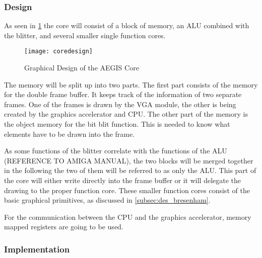 \subsubsection*{Design}
As seen in \cref{img:coredes} the core will consist of a block of memory, an ALU combined with the blitter, and several smaller single function cores.
\begin{figure}[H]
	\centering
	\texttt{[image: coredesign]}
	\caption{Graphical Design of the AEGIS Core }
	\label{img:coredes}
\end{figure}

The memory will be split up into two parts. The first part consists of the memory for the double frame buffer. It keeps track of the information of two separate frames. One of the frames is drawn by the VGA module, the other is being created by the graphics accelerator and CPU. The other part of the memory is the object memory for the bit blit function. This is needed to know what elements have to be drawn into the frame.

As some functions of the blitter correlate with the functions of the ALU (REFERENCE TO AMIGA MANUAL), the two blocks will be merged together in the following the two of them will be referred to as only the ALU. This part of the core will either write directly into the frame buffer or it will delegate the drawing to the proper function core. These smaller function cores consist of the basic graphical primitives, as discussed in \cref{subsec:des_bresenham}.

For the communication between the CPU and the graphics accelerator, memory mapped registers are going to be used.

\subsubsection*{Implementation}